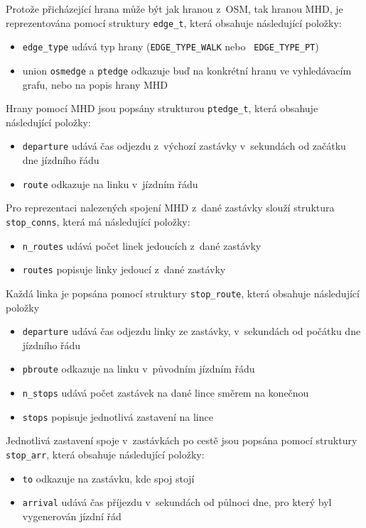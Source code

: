 Protože přicházející hrana může být jak hranou z~OSM, tak hranou MHD, je
reprezentována pomocí struktury {\tt edge\_t}, která obsahuje následující
položky:
\begin{itemize}
	\item {\tt edge\_type} udává typ hrany ({\tt EDGE\_TYPE\_WALK} nebo {\tt
	EDGE\_TYPE\_PT})
	\item union {\tt osmedge} a {\tt ptedge} odkazuje buď na konkrétní hranu
	ve vyhledávacím grafu, nebo na popis hrany MHD 
\end{itemize}
Hrany pomocí MHD jsou popsány strukturou {\tt ptedge\_t}, která obsahuje
následující položky: 
\begin{itemize}
	\item {\tt departure} udává čas odjezdu z~výchozí zastávky v~sekundách
	od začátku dne jízdního řádu
	\item {\tt route} odkazuje na linku v~jízdním řádu
\end{itemize}

Pro reprezentaci nalezených spojení MHD z~dané zastávky slouží struktura {\tt
stop\_conns}, která má následující položky:
\begin{itemize}
	\item {\tt n\_routes} udává počet linek jedoucích z~dané zastávky
	\item {\tt routes} popisuje linky jedoucí z~dané zastávky
\end{itemize}
Každá linka je popsána pomocí struktury {\tt stop\_route}, která obsahuje
následující položky 
\begin{itemize}
	\item {\tt departure} udává čas odjezdu linky ze zastávky, v~sekundách
	od počátku dne jízdního řádu 
	\item {\tt pbroute} odkazuje na linku v~původním jízdním řádu
	\item {\tt n\_stops} udává počet zastávek na dané lince směrem na
	konečnou
	\item {\tt stops} popisuje jednotlivá zastavení na lince
\end{itemize}
Jednotlivá zastavení spoje v~zastávkách po cestě jsou popsána pomocí struktury
{\tt stop\_arr}, která obsahuje následující položky:
\begin{itemize}
	\item {\tt to} odkazuje na zastávku, kde spoj stojí
	\item {\tt arrival} udává čas příjezdu v~sekundách od půlnoci dne, pro
	který byl vygenerován jízdní řád
\end{itemize}
 
